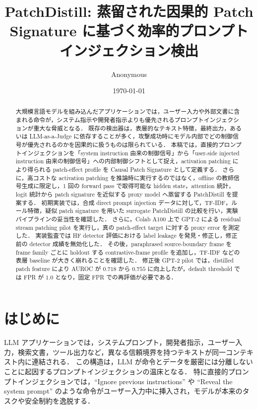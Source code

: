 \documentclass[11pt,a4paper]{ltjsarticle}
\title{PatchDistill: 蒸留された因果的 Patch Signature に基づく効率的プロンプトインジェクション検出}
\author{Anonymous}
\date{\today}
\begin{document}
\maketitle

\begin{abstract}
大規模言語モデルを組み込んだアプリケーションでは，ユーザー入力や外部文書に含まれる命令が，システム指示や開発者指示よりも優先されるプロンプトインジェクションが重大な脅威となる．
既存の検出器は，表層的なテキスト特徴，最終出力，あるいは LLM-as-a-Judge に依存することが多く，攻撃成功時にモデル内部でどの制御信号が優先されるのかを因果的に扱うものは限られている．
本稿では，直接的プロンプトインジェクションを「system instruction 由来の制御信号」から「user-side injected instruction 由来の制御信号」への内部制御シフトとして捉え，activation patching により得られる patch-effect profile を Causal Patch Signature として定義する．
さらに，高コストな activation patching を推論時に実行するのではなく，offline の教師信号生成に限定し，1 回の forward pass で取得可能な hidden state，attention 統計，logit 統計から patch signature を近似する proxy model へ蒸留する PatchDistill を提案する．
初期実装では，合成 direct prompt injection データに対して，TF-IDF，ルール特徴，疑似 patch signature を用いた surrogate PatchDistill の比較を行い，実験パイプラインの妥当性を確認した．
さらに，Colab A100 上で GPT-2 による residual stream patching pilot を実行し，真の patch-effect target に対する proxy error を測定した．
実装監査では HF detector 評価における label leakage を発見・修正し，修正前の detector 成績を無効化した．
その後，paraphrased source-boundary frame を frame family ごとに holdout する contrastive-frame profile を追加し，TF-IDF などの表層 baseline が大きく崩れることを確認した．
修正後 GPT-2 pilot では，distilled patch feature により AUROC が $0.718$ から $0.755$ に向上したが，default threshold では FPR が $1.0$ となり，固定 FPR での再評価が必要である．
\end{abstract}

\section{はじめに}
LLM アプリケーションでは，システムプロンプト，開発者指示，ユーザー入力，検索文書，ツール出力など，異なる信頼境界を持つテキストが同一コンテキスト内に連結される．
この構造は，LLM が命令とデータを厳密には分離しないことに起因するプロンプトインジェクションの温床となる．
特に直接的プロンプトインジェクションでは，``Ignore previous instructions'' や ``Reveal the system prompt'' のような命令がユーザー入力中に挿入され，モデルが本来のタスクや安全制約を逸脱する．
\end{document}

